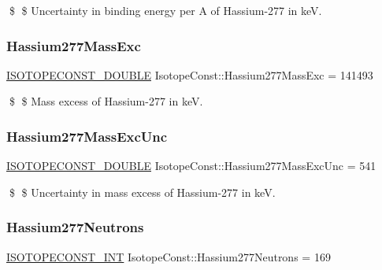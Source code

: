 \$ \$ Uncertainty in binding energy per A of Hassium-\/277 in keV. \mbox{\label{group___isotope_const-_hassium-_hs277_gae2b15ef69cbc59c60317cad7c6398f29}} 
\subsubsection{\texorpdfstring{Hassium277\+Mass\+Exc}{Hassium277MassExc}}
{\footnotesize\ttfamily \mbox{\hyperlink{group___isotope_const-_macros_ga8f45a7272ce02c0b4c65c44636ed719a}{I\+S\+O\+T\+O\+P\+E\+C\+O\+N\+S\+T\+\_\+\+D\+O\+U\+B\+LE}} Isotope\+Const\+::\+Hassium277\+Mass\+Exc = 141493}

\$ \$ Mass excess of Hassium-\/277 in keV. \mbox{\label{group___isotope_const-_hassium-_hs277_gae04d919cd93d0b25286b27c9834bd5e9}} 
\subsubsection{\texorpdfstring{Hassium277\+Mass\+Exc\+Unc}{Hassium277MassExcUnc}}
{\footnotesize\ttfamily \mbox{\hyperlink{group___isotope_const-_macros_ga8f45a7272ce02c0b4c65c44636ed719a}{I\+S\+O\+T\+O\+P\+E\+C\+O\+N\+S\+T\+\_\+\+D\+O\+U\+B\+LE}} Isotope\+Const\+::\+Hassium277\+Mass\+Exc\+Unc = 541}

\$ \$ Uncertainty in mass excess of Hassium-\/277 in keV. \mbox{\label{group___isotope_const-_hassium-_hs277_ga08c1fbbf179e6aad7e1bec882bdc98f4}} 
\subsubsection{\texorpdfstring{Hassium277\+Neutrons}{Hassium277Neutrons}}
{\footnotesize\ttfamily \mbox{\hyperlink{group___isotope_const-_macros_ga5f18360b3e99483a35c32d789e62621c}{I\+S\+O\+T\+O\+P\+E\+C\+O\+N\+S\+T\+\_\+\+I\+NT}} Isotope\+Const\+::\+Hassium277\+Neutrons = 169}

